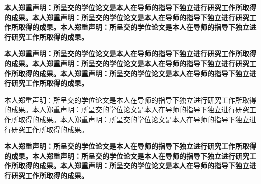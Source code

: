 \documentclass[class = professional, twoside, AutoFakeBold=3.17,AutoFakeSlant=0.2]{gdufe_master_thesis}
\begin{document}
\textbf{本人郑重声明：所呈交的学位论文是本人在导师的指导下独立进行研究工作所取得的成果。本人郑重声明：所呈交的学位论文是本人在导师的指导下独立进行研究工作所取得的成果。本人郑重声明：所呈交的学位论文是本人在导师的指导下独立进行研究工作所取得的成果。
\the\baselineskip}

{\bfseries 本人郑重声明：所呈交的学位论文是本人在导师的指导下独立进行研究工作所取得的成果。本人郑重声明：所呈交的学位论文是本人在导师的指导下独立进行研究工作所取得的成果。本人郑重声明：所呈交的学位论文是本人在导师的指导下独立进行研究工作所取得的成果。
\the\baselineskip}

本人郑重声明：所呈交的学位论文是本人在导师的指导下独立进行研究工作所取得的成果。本人郑重声明：所呈交的学位论文是本人在导师的指导下独立进行研究工作所取得的成果。本人郑重声明：所呈交的学位论文是本人在导师的指导下独立进行研究工作所取得的成果。
\the\baselineskip

\bfseries 本人郑重声明：所呈交的学位论文是本人在导师的指导下独立进行研究工作所取得的成果。本人郑重声明：所呈交的学位论文是本人在导师的指导下独立进行研究工作所取得的成果。本人郑重声明：所呈交的学位论文是本人在导师的指导下独立进行研究工作所取得的成果。
\the\baselineskip
\end{document}

